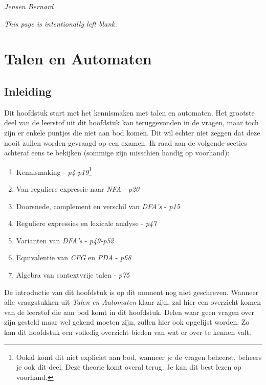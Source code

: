 \documentclass[10pt,a4paper]{article}
\begin{document}
\hfill \emph{Jensen Bernard}
\newpage
\tableofcontents
\newpage
\begin{center}
	\emph{This page is intentionally left blank.}
\end{center}

\newpage
\clearpage
{}

\section{Talen en Automaten}

\subsection{Inleiding}

	Dit hoofdstuk start met het kennismaken met talen en automaten. Het grootste deel van de leerstof uit dit hoofdstuk kan teruggevonden in de vragen, maar toch zijn er enkele puntjes die niet aan bod komen. Dit wil echter niet zeggen dat deze nooit zullen worden gevraagd op een examen. Ik raad aan de volgende secties achteraf eens te bekijken (sommige zijn misschien handig op voorhand):
	\begin{enumerate}
		\item Kennismaking - \emph{p4-p19}\footnote{Ookal komt dit niet expliciet aan bod, wanneer je de vragen beheerst, beheers je ook dit deel. Deze theorie komt overal terug. Je kan dit best lezen op voorhand.}
		\item Van reguliere expressie naar \emph{NFA} - \emph{p20}
		\item Doorsnede, complement en verschil van \emph{DFA's} - \emph{p15}
		\item Reguliere expressies en lexicale analyse - \emph{p47}
		\item Varianten van \emph{DFA's} - \emph{p49-p52}
		\item Equivalentie van \emph{CFG} en \emph{PDA} - \emph{p68}
		\item Algebra van contextvrije talen - \emph{p75}
	\end{enumerate}

	De introductie van dit hoofdstuk is op dit moment nog niet geschreven. Wanneer alle vraagstukken uit \emph{Talen en Automaten} klaar zijn, zal hier een overzicht komen van de leerstof die aan bod komt in dit hoofdstuk. Delen waar geen vragen over zijn gesteld maar wel gekend moeten zijn, zullen hier ook opgelijst worden. Zo kan dit hoofdstuk een volledig overzicht bieden van wat er over te kennen valt.
\end{document}
